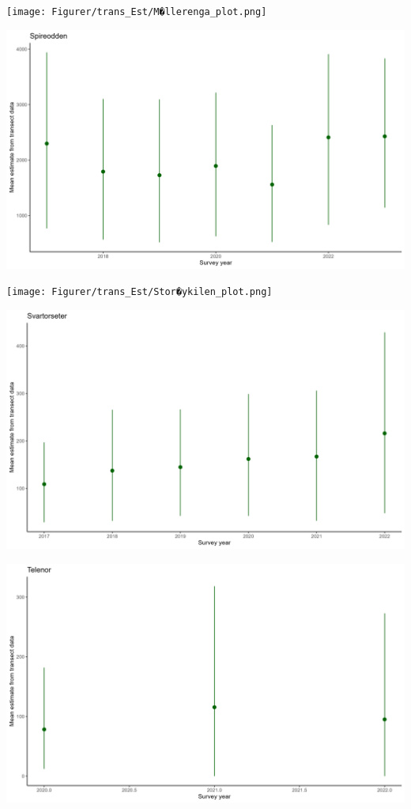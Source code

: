 \documentclass[
  letterpaper,
  DIV=11,
  numbers=noendperiod]{scrreport}
\begin{document}
\texttt{[image: Figurer/trans\_Est/M�llerenga\_plot.png]}

\includegraphics{Figurer/trans_Est/Spireodden_plot.png}

\texttt{[image: Figurer/trans\_Est/Stor�ykilen\_plot.png]}

\includegraphics{Figurer/trans_Est/Svartorseter_plot.png}

\includegraphics{Figurer/trans_Est/Telenor_plot.png}
\end{document}
